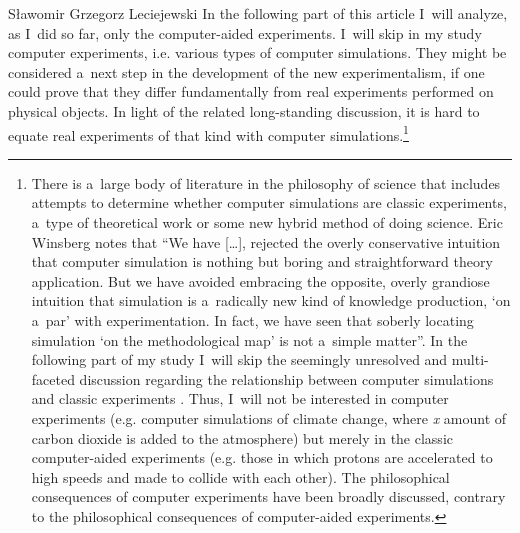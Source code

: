 \begin{artengenv}{Sławomir Grzegorz Leciejewski}
In the following part of this article I~will analyze, as I~did so far, only the computer-aided experiments. I~will skip in my study computer experiments, i.e. various types of computer simulations. They might be considered a~next step in the development of the new experimentalism, if one could prove that they differ fundamentally from real experiments performed on physical objects. In light of the related long-standing discussion, it is hard to equate real experiments of that kind with computer simulations.\footnote{There is a~large body of literature in the philosophy of science that includes attempts to determine whether computer simulations are classic experiments, a~type of theoretical work or some new hybrid method of doing science.
Eric Winsberg
\parencite*[][p.136]{winsberg_science_2010}
 notes that ``We have […], rejected the overly conservative intuition that computer simulation is nothing but boring and straightforward theory application. But we have avoided embracing the opposite, overly grandiose intuition that simulation is a~radically new kind of knowledge production, ‘on a~par' with experimentation. In fact, we have seen that soberly locating simulation ‘on the methodological map' is not a~simple matter''. In the following part of my study I~will skip the seemingly unresolved and multi-faceted discussion regarding the relationship between computer simulations and classic experiments
\parencites[][]{kaufmann_supercomputing_1993}[][]{humphreys_computational_1995}[][]{morgan_ising_1999}[][]{miller_why_2001}[][]{guala_models_2002}[][]{guala_paradigmatic_2008}[][]{morgan_experiments_2003}[][]{gilbert_simulation_2005}[][]{giere_is_2009}[][]{morrison_models_2009}[][]{parker_does_2009}[][]{parker_computer_2017}[][]{peschard_modeling_2009}[][]{winsberg_tale_2009}[][]{parke_experiments_2014}%
. Thus, I~will not be interested in computer experiments (e.g. computer simulations of climate change, where \textit{x} amount of carbon dioxide is added to the atmosphere) but merely in the classic computer-aided experiments (e.g. those in which protons are accelerated to high speeds and made to collide with each other). The philosophical consequences of computer experiments have been broadly discussed, contrary to the philosophical consequences of computer-aided experiments.}




\end{artengenv}
